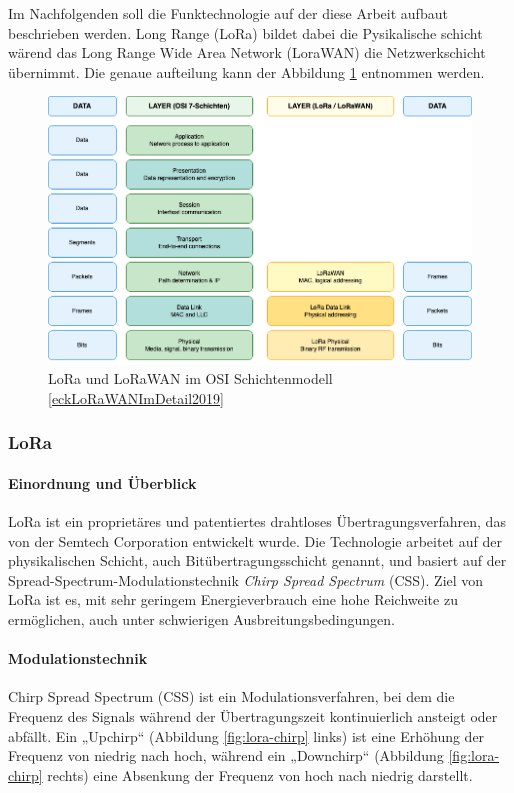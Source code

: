 Im Nachfolgenden soll die Funktechnologie auf der diese Arbeit aufbaut beschrieben werden. Long Range (LoRa) bildet dabei die Pysikalische schicht wärend das Long Range Wide Area Network (LoraWAN) die Netzwerkschicht übernimmt. Die genaue aufteilung kann der Abbildung \ref{fig:lora-lorawan-osi} entnommen werden.

\begin{figure}[H]
\centering
\includegraphics[scale=.4]{figures/diagrams/LoraWAN_OSI.png}
\caption{LoRa und LoRaWAN im OSI Schichtenmodell \ref{eckLoRaWANImDetail2019}}
\label{fig:lora-lorawan-osi}
\end{figure}

\subsubsection*{LoRa}

\paragraph*{Einordnung und Überblick}  
LoRa ist ein proprietäres und patentiertes drahtloses Übertragungsverfahren, das von der Semtech Corporation entwickelt wurde. 
Die Technologie arbeitet auf der physikalischen Schicht, auch Bitübertragungsschicht genannt, und basiert auf der Spread-Spectrum-Modulationstechnik \textit{Chirp Spread Spectrum} (CSS). 
Ziel von LoRa ist es, mit sehr geringem Energieverbrauch eine hohe Reichweite zu ermöglichen, auch unter schwierigen Ausbreitungsbedingungen. 

\paragraph*{Modulationstechnik}  
Chirp Spread Spectrum (CSS) ist ein Modulationsverfahren, bei dem die Frequenz des Signals während der Übertragungszeit kontinuierlich ansteigt oder abfällt.
Ein „Upchirp“ (Abbildung \ref{fig:lora-chirp} links) ist eine Erhöhung der Frequenz von niedrig nach hoch, während ein „Downchirp“ (Abbildung \ref{fig:lora-chirp} rechts) eine Absenkung der Frequenz von hoch nach niedrig darstellt. 


